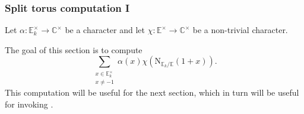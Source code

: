 \documentclass[12pt, reqno]{amsart}
\theoremstyle{definition}
\theoremstyle{definition}
\theoremstyle{definition}
\newcommand{\cComplex}{\mathbb{C}}
\newcommand{\multiplicativegroup}[1]{#1^{\times}}
\newcommand{\aFieldNorm}{\mathrm{N}}
\newcommand{\quadraticExtension}{\mathbb{E}}
\newcommand{\quadraticFieldExtension}[1]{\quadraticExtension_{#1}}
\begin{document}
\subsubsection{Split torus computation I}
Let $\alpha \colon \multiplicativegroup{\quadraticFieldExtension{k}} \to \multiplicativegroup{\cComplex}$ be a character and let $\chi \colon \multiplicativegroup{\quadraticExtension} \to \multiplicativegroup{\cComplex}$ be a non-trivial character.

The goal of this section is to compute $$\sum_{\substack{x \in \multiplicativegroup{\quadraticFieldExtension{k}}\\
x \ne -1}} \alpha\left(x\right) \chi\left(\aFieldNorm_{\quadraticFieldExtension{k} \slash \quadraticExtension}\left(1+x\right)\right).$$
This computation will be useful for the next section, which in turn will be useful for invoking .
\end{document}
